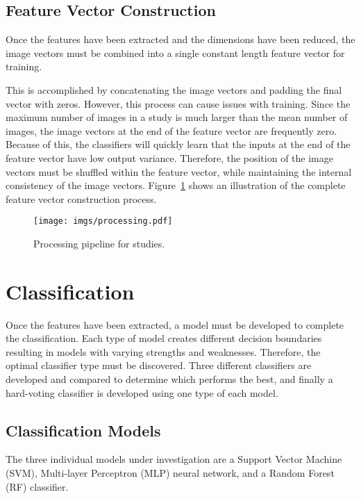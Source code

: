 \documentclass{IEEEtran}
\begin{document}
	\subsection{Feature Vector Construction}
	
	Once the features have been extracted and the dimensions have been reduced, the image vectors must be combined into a single constant length feature vector for training. 
	
	This is accomplished by concatenating the image vectors and padding the final vector with zeros. However, this process can cause issues with training. Since the maximum number of images in a study is much larger than the mean number of images, the image vectors at the end of the feature vector are frequently zero. Because of this, the classifiers will quickly learn that the inputs at the end of the feature vector have low output variance. Therefore, the position of the image vectors must be shuffled within the feature vector, while maintaining the internal consistency of the image vectors. Figure~\ref{fig:shuffle} shows an illustration of the complete feature vector construction process.
	
	\begin{figure}[t!]
		\centering
		\texttt{[image: imgs/processing.pdf]}
		\caption{Processing pipeline for studies.}
		\label{fig:shuffle}
	\end{figure}
	
	\section{Classification} \label{sec:classifiers}
	
	Once the features have been extracted, a model must be developed to complete the classification. Each type of model creates different decision boundaries resulting in models with varying strengths and weaknesses. Therefore, the optimal classifier type must be discovered. Three different classifiers are developed and compared to determine which performs the best, and finally a hard-voting classifier is developed using one type of each model.
	
	\subsection{Classification Models}
	
	The three individual models under investigation are a Support Vector Machine (SVM), Multi-layer Perceptron (MLP) neural network, and a Random Forest (RF) classifier. 
	
\end{document}
